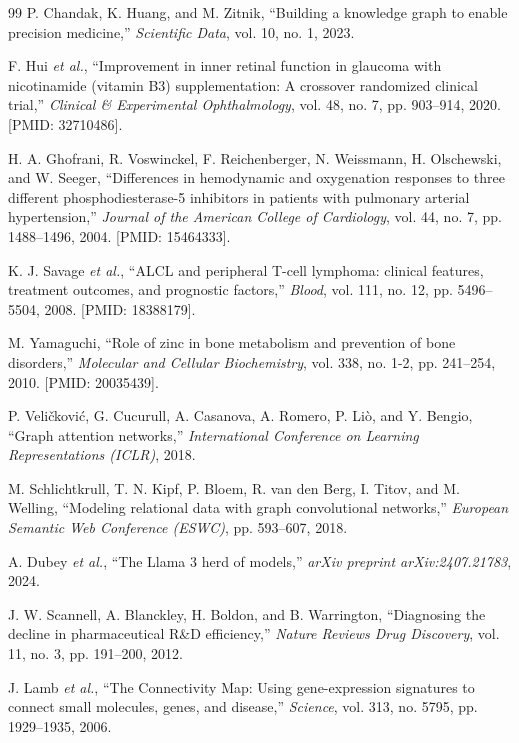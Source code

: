 \documentclass[preprint,12pt]{elsarticle}
\begin{document}
\begin{thebibliography}{99}
 P. Chandak, K. Huang, and M. Zitnik, 
``Building a knowledge graph to enable precision medicine,'' 
\textit{Scientific Data}, vol. 10, no. 1, 2023.

 F. Hui \textit{et al.}, 
``Improvement in inner retinal function in glaucoma with nicotinamide (vitamin B3) supplementation: A crossover randomized clinical trial,'' 
\textit{Clinical \& Experimental Ophthalmology}, vol. 48, no. 7, pp. 903--914, 2020. [PMID: 32710486].

 H. A. Ghofrani, R. Voswinckel, F. Reichenberger, N. Weissmann, H. Olschewski, and W. Seeger, 
``Differences in hemodynamic and oxygenation responses to three different phosphodiesterase-5 inhibitors in patients with pulmonary arterial hypertension,'' 
\textit{Journal of the American College of Cardiology}, vol. 44, no. 7, pp. 1488--1496, 2004. [PMID: 15464333].

 K. J. Savage \textit{et al.}, 
``ALCL and peripheral T-cell lymphoma: clinical features, treatment outcomes, and prognostic factors,'' 
\textit{Blood}, vol. 111, no. 12, pp. 5496--5504, 2008. [PMID: 18388179].

 M. Yamaguchi, 
``Role of zinc in bone metabolism and prevention of bone disorders,'' 
\textit{Molecular and Cellular Biochemistry}, vol. 338, no. 1-2, pp. 241--254, 2010. [PMID: 20035439].

 P. Veli{\v{c}}kovi{\'c}, G. Cucurull, A. Casanova, A. Romero, P. Li{\`o}, and Y. Bengio, 
``Graph attention networks,''
\textit{International Conference on Learning Representations (ICLR)}, 2018.

 M. Schlichtkrull, T. N. Kipf, P. Bloem, R. van den Berg, I. Titov, and M. Welling, 
``Modeling relational data with graph convolutional networks,'' 
\textit{European Semantic Web Conference (ESWC)}, pp. 593--607, 2018.

 A. Dubey \textit{et al.}, 
``The Llama 3 herd of models,''
\textit{arXiv preprint arXiv:2407.21783}, 2024.


 J. W. Scannell, A. Blanckley, H. Boldon, and B. Warrington, 
``Diagnosing the decline in pharmaceutical R\&D efficiency,''
\textit{Nature Reviews Drug Discovery}, vol. 11, no. 3, pp. 191--200, 2012.

 J. Lamb \textit{et al.}, 
``The Connectivity Map: Using gene-expression signatures to connect small molecules, genes, and disease,''
\textit{Science}, vol. 313, no. 5795, pp. 1929--1935, 2006.


\end{thebibliography}
\end{document}
